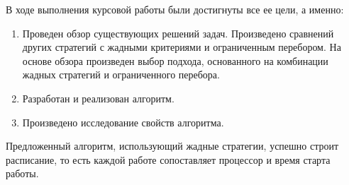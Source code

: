 В ходе выполнения курсовой работы были достигнуты все ее цели, а именно:
\begin{enumerate}
    \item Проведен обзор существующих решений задач. Произведено сравнений других стратегий с жадными критериями и ограниченным перебором. На основе обзора произведен выбор подхода, основанного на комбинации жадных стратегий и ограниченного перебора. 
    \item Разработан и реализован алгоритм.
    \item Произведено исследование свойств алгоритма.
\end{enumerate}

Предложенный алгоритм, использующий жадные стратегии, успешно строит расписание, то есть каждой работе сопоставляет процессор и время старта работы.